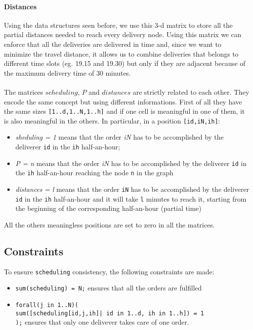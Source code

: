\documentclass[10pt]{article}
\begin{document}

	\paragraph*{Distances}
	Using the data structures seen before, we use this 3-d matrix to store all
	the partial distances needed to reach every delivery node. Using this matrix we can 
	enforce that all the deliveries are delivered in time and, since we want to minimize 
	the travel distance, it allows us to combine deliveries that belongs to different
	time slots (eg. 19.15 and 19.30) but only if they are adjacent because of the maximum 
	delivery time of 30 minutes.

	\paragraph*{}
	The matrices $scheduling$, $P$ and $distances$ are strictly related to each other.
	They encode the same concept but using different informations. First of
	all they have the same sizes \texttt{[1..d,1..N,1..h]} and if one cell is meaningful in
	one	of them, it is also meaningful in the others.
	In particular, in a position 
	\texttt{[id,iN,ih]}:
	\begin{itemize}
		\item \textit{sheduling = 1} means that the order \textit{iN} has to be
		accomplished by the deliverer \texttt{id} in the \texttt{ih} half-an-hour;
		\item \textit{P = n} means that the order \textit{iN} has to be
		accomplished by the deliverer \texttt{id} in the \texttt{ih} half-an-hour 
		reaching the node \texttt{n} in the graph
		\item \textit{distances = l} means that the order \texttt{iN} has to be
		accomplished by the deliverer \texttt{id} in the \texttt{ih} half-an-hour 
		and it will take \texttt{l} minutes to reach it, starting from the beginning of the
		corresponding half-an-hour (partial time) 
		 
	\end{itemize}
	All the others meaningless positions are set to zero in all the matrices.

	\subsection{Constraints}

	To ensure \texttt{scheduling} consistency, the following constraints are made:
	\begin{itemize}
		\item \texttt{sum(scheduling) = N;} ensures that all the orders are fulfilled %
		\item \texttt{forall(j in 1..N)(\\
			sum([scheduling[id,j,ih]| id in 1..d, ih in 1..h]) = 1\\
		  );} ensures that only one delivever takes care of one order. 
	\end{itemize}
\end{document}

